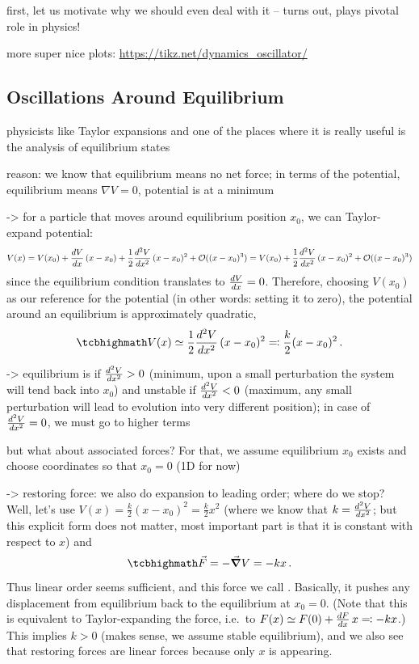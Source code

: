\documentclass[../class_mech_main.tex]{subfiles}
\begin{document}
first, let us motivate why we should even deal with it -- turns out, plays pivotal role in physics!

more super nice plots: \url{https://tikz.net/dynamics_oscillator/}



		\subsection{Oscillations Around Equilibrium}
		\label{subsec:osc_around_equ}
physicists like Taylor expansions and one of the places where it is really useful is the analysis of equilibrium states

reason: we know that equilibrium means no net force; in terms of the potential, equilibrium means $\nabla V = 0$, potential is at a minimum

-> for a particle that moves around equilibrium position $x_0$, we can Taylor-expand potential:
\begin{equation*}
	V(x) = V(x_0) + \dv{V}{x}(x_0) \, (x - x_0) + \frac{1}{2} \dv[2]{V}{x}(x_0) \, (x - x_0)^2 + \mathcal{O}((x - x_0)^3) = V(x_0) + \frac{1}{2} \dv[2]{V}{x}(x_0) \, (x - x_0)^2 + \mathcal{O}((x - x_0)^3)
\end{equation*}
since the equilibrium condition translates to $\dv{V}{x}(x_0) = 0$. Therefore, choosing $V(x_0)$ as our reference for the potential (in other words: setting it to zero), the potential around an equilibrium is approximately quadratic,
\begin{equation}
	\eqbox{
		V(x) \simeq \frac{1}{2} \dv[2]{V}{x} \, (x - x_0)^2 \eqqcolon \frac{k}{2} (x - x_0)^2
	}
	\, .
\end{equation}

-> equilibrium is  if $\dv[2]{V}{x}(x_0) > 0$ (minimum, upon a small perturbation the system will tend back into $x_0$) and unstable if $\dv[2]{V}{x}(x_0) < 0$ (maximum, any small perturbation will lead to evolution into very different position); in case of $\dv[2]{V}{x}(x_0) = 0$, we must go to higher terms



but what about associated forces? For that, we assume equilibrium $x_0$ exists and choose coordinates so that $x_0 = 0$ (1D for now)

-> restoring force: we also do expansion to leading order; where do we stop? Well, let's use $V(x) = \frac{k}{2} (x - x_0)^2 = \frac{k}{2} x^2$ (where we know that $k = \dv[2]{V}{x}(x_0 = 0)$; but this explicit form does not matter, most important part is that it is constant with respect to $x$) and
\begin{equation}\label{eq:restoring_force}
	\eqbox{
		\vec{F} = - \grad V = - k x
	} \, .
\end{equation}
Thus linear order seems sufficient, and this force we call . Basically, it pushes any displacement from equilibrium back to the equilibrium at $x_0 = 0$. (Note that this is equivalent to Taylor-expanding the force, i.e.~to $F(x) \simeq F(0) + \dv{F}{x}(x_0) \, x \eqqcolon - k x$.) This implies $k > 0$ (makes sense, we assume stable equilibrium), and we also see that restoring forces are linear forces because only $x$ is appearing.
\end{document}
